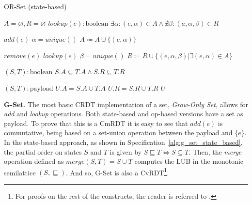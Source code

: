 \begin{algorithm}[t]
\small{
	\caption{OR-Set (state-based)}
 	\label{alg:or_set_state_based}                       

 	\begin{algorithmic}[1]
 	  \State \Payload $A = \varnothing, R = \varnothing$
 	  \State \Query $lookup(e) : \text{boolean}$
 	  \State \hspace{\algorithmicindent} \Return $\exists \alpha : (e, \alpha) \in A \land \nexists \beta : (a, \alpha, \beta) \in R$
 	  
 	  \State \Update $add(e)$
 	  \State \hspace{\algorithmicindent} \Let $\alpha = unique()$
 	  \State \hspace{\algorithmicindent} $A \coloneqq A \cup \{(e, \alpha)\}$
 	  
 	  \State \Update $remove(e)$
 	  \State \hspace{\algorithmicindent} \Pre $lookup(e)$
 	  \State \hspace{\algorithmicindent} \Let $\beta = unique()$
 	  \State \hspace{\algorithmicindent} $R \coloneqq R \cup \{(e, \alpha, \beta) | \exists (e, \alpha) \in A\}$
 	  
 	  \State \Compare $(S, T) : \text{boolean}$
 	  \State \hspace{\algorithmicindent} \Return $S.A \subseteq T.A \land S.R \subseteq T.R$ 
 	  
 	  \State \Merge $(S, T) : \text{payload}$
 	  \State \hspace{\algorithmicindent} \Let $U.A = S.A \cup T.A$
 	  \State \hspace{\algorithmicindent} \Let $U.R = S.R \cup T.R$
 	  \State \hspace{\algorithmicindent} \Return $U$
	\end{algorithmic}
 }
\end{algorithm}

\textbf{G-Set}. The most basic CRDT implementation of a set, \textit{Grow-Only
Set}, allows for \textit{add} and \textit{lookup} operations. Both state-based and
op-based versions have a set as payload. To prove that this is a CmRDT it is
easy to see that $\textit{add}(e)$ is commutative, being based on a set-union
operation between the payload and $\{e\}$. In the state-based approach, as shown
in Specification~\ref{alg:g_set_state_based}, the partial order on states $S$
and $T$ is given by $S \sqsubseteq T \iff S \subseteq T$. Then, the
\textit{merge} operation defined as $\textit{merge}(S,T) = S \cup T$ computes
the LUB in the monotonic semilattice $(S, \sqsubseteq)$. And so, G-Set is also a
CvRDT\footnote{For proofs on the rest of the constructs, the reader is
referred to \cite{shapiro:inria-00555588}.}.

